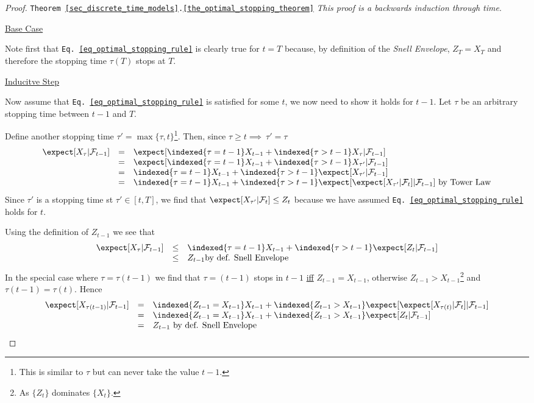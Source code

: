 \documentclass[11pt,a4paper]{article}
\begin{document}
  \begin{proof}{\texttt{Theorem \ref{sec_discrete_time_models}.\ref{the_optimal_stopping_theorem}}}
    \textit{This proof is a backwards induction through time}.
    \par \underline{Base Case}
    \par Note first that  \texttt{Eq. \ref{eq_optimal_stopping_rule}} is clearly true for $t=T$ because, by definition of the \textit{Snell Envelope}, $Z_T=X_T$ and therefore the stopping time $\tau(T)$ stops at $T$.
    \par \underline{Inducitve Step}
    \par Now assume that \texttt{Eq. \ref{eq_optimal_stopping_rule}} is satisfied for some $t$, we now need to show it holds for $t-1$. Let $\tau$ be an arbitrary stopping time between $t-1$ and $T$.
    \par Define another stopping time $\tau'=\max\{\tau,t\}$\footnote{This is similar to $\tau$ but can never take the value $t-1$.}. Then, since $\tau\geq t\implies\ \tau'=\tau$
    \[\begin{array}{rcl}
      \expect[X_\tau|\mathcal{F}_{t-1}]&=&\expect[\indexed\{\tau=t-1\}X_{t-1}+\indexed\{\tau>t-1\}X_\tau|\mathcal{F}_{t-1}]\\
      &=&\expect[\indexed\{\tau=t-1\}X_{t-1}+\indexed\{\tau>t-1\}X_{\tau'}|\mathcal{F}_{t-1}]\\
      &=&\indexed\{\tau=t-1\}X_{t-1}+\indexed\{\tau>t-1\}\expect[X_{\tau'}|\mathcal{F}_{t-1}]\\
      &=&\indexed\{\tau=t-1\}X_{t-1}+\indexed\{\tau>t-1\}\expect[\expect[X_{\tau'}|\mathcal{F}_t]|\mathcal{F}_{t-1}]\text{ by Tower Law}
    \end{array}\]
    Since $\tau'$ is a stopping time st $\tau'\in[t,T]$, we find that $\expect[X_{\tau'}|\mathcal{F}_t]\leq Z_t$ because we have assumed \texttt{Eq. \ref{eq_optimal_stopping_rule}} holds for $t$.
    \par Using the definition of $Z_{t-1}$ we see that
    \[\begin{array}{rcl}
      \expect[X_\tau|\mathcal{F}_{t-1}]&\leq&\indexed\{\tau=t-1\}X_{t-1}+\indexed\{\tau>t-1\}\expect[Z_t|\mathcal{F}_{t-1}]\\
      &\leq&Z_{t-1}\text{by def. Snell Envelope}
    \end{array}\]
    In the special case where $\tau=\tau(t-1)$ we find that $\tau=(t-1)$ stops in $t-1$ \underline{iff} $Z_{t-1}=X_{t-1}$, otherwise $Z_{t-1}>X_{t-1}$\footnote{As $\{Z_t\}$ dominates $\{X_t\}$.} and $\tau(t-1)=\tau(t)$. Hence
    \[\begin{array}{rcl}
      \expect[X_{\tau(t-1)}|\mathcal{F}_{t-1}]&=&\indexed\{Z_{t-1}=X_{t-1}\}X_{t-1}+\indexed\{Z_{t-1}>X_{t-1}\}\expect[\expect[X_{\tau(t)}|\mathcal{F}_t]|\mathcal{F}_{t-1}]\\
      &=&\indexed\{Z_{t-1}=X_{t-1}\}X_{t-1}+\indexed\{Z_{t-1}>X_{t-1}\}\expect[Z_t|\mathcal{F}_{t-1}]\\
      &=&Z_{t-1}\text{ by def. Snell Envelope}
    \end{array}\]
  \end{proof}
\end{document}
